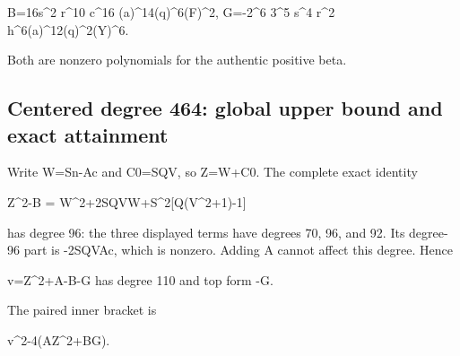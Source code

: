 B\textasteriskcentered{}\allowbreak{}=\allowbreak{}16s\textasciicircum{}\allowbreak{}2 r\textasciicircum{}\allowbreak{}10 c\textasciicircum{}\allowbreak{}16 (a\textasteriskcentered{}\allowbreak{})\textasciicircum{}\allowbreak{}14(q\textasteriskcentered{}\allowbreak{})\textasciicircum{}\allowbreak{}6(F\textasteriskcentered{}\allowbreak{})\textasciicircum{}\allowbreak{}2, G\textasteriskcentered{}\allowbreak{}=\allowbreak{}-2\textasciicircum{}\allowbreak{}6 3\textasciicircum{}\allowbreak{}5 s\textasciicircum{}\allowbreak{}4 r\textasciicircum{}\allowbreak{}2 h\textasciicircum{}\allowbreak{}6(a\textasteriskcentered{}\allowbreak{})\textasciicircum{}\allowbreak{}12(q\textasteriskcentered{}\allowbreak{})\textasciicircum{}\allowbreak{}2(Y\textasteriskcentered{}\allowbreak{})\textasciicircum{}\allowbreak{}6.



Both are nonzero polynomials for the authentic positive beta.



\subsection*{Centered degree 464: global upper bound and exact attainment}



Write W=\allowbreak{}Sn-Ac and C0=\allowbreak{}SQV, so Z=\allowbreak{}W+\allowbreak{}C0. The complete exact identity



Z\textasciicircum{}\allowbreak{}2-B =\allowbreak{} W\textasciicircum{}\allowbreak{}2+\allowbreak{}2SQVW+\allowbreak{}S\textasciicircum{}\allowbreak{}2[Q(V\textasciicircum{}\allowbreak{}2+\allowbreak{}1)-1]



has degree 96: the three displayed terms have degrees 70, 96, and 92. Its degree-96 part is -2S\textasteriskcentered{}\allowbreak{}Q\textasteriskcentered{}\allowbreak{}V\textasteriskcentered{}\allowbreak{}Ac\textasteriskcentered{}\allowbreak{}, which is nonzero. Adding A cannot affect this degree. Hence



v=\allowbreak{}Z\textasciicircum{}\allowbreak{}2+\allowbreak{}A-B-G has degree 110 and top form -G\textasteriskcentered{}\allowbreak{}.



The paired inner bracket is



v\textasciicircum{}\allowbreak{}2-4(AZ\textasciicircum{}\allowbreak{}2+\allowbreak{}BG).



